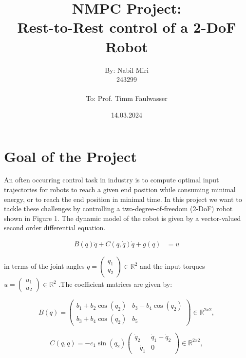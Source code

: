 \documentclass[a4paper, 12pt]{report}
\begin{document}
\title{\Large{\textbf{NMPC Project: \\Rest-to-Rest control of a 2-DoF Robot}}}
\author{By: Nabil Miri \\
243299\\
\\
To: Prof. Timm Faulwasser
}
\date{14.03.2024}
\maketitle
\let\cleardoublepage\clearpage
\newpage
\tableofcontents
\newpage
\setcounter{section}{0}
\renewcommand\thesection{\arabic{section}} %
\renewcommand\thesubsection{\alph{subsection})} %

\section{Goal of the Project}

An often occurring control task in industry is to compute optimal input trajectories for robots to reach a
given end position while consuming minimal energy, or to reach the end position in minimal time. In this
project we want to tackle these challenges by controlling a two-degree-of-freedom (2-DoF) robot shown in
Figure 1. The dynamic model of the robot is given by a vector-valued second order differential equation.

\begin{align}
B(q)\ddot{q} + C(q, \dot{q})\dot{q} + g(q) &= u
\end{align}


in terms of the joint angles $q = \begin{pmatrix} q_1 \\ q_2 \end{pmatrix} \in \mathbb{R}^2$ and the input torques $u = \begin{pmatrix} u_1 \\ u_2 \end{pmatrix}\in \mathbb{R}^2$ .The coefficient matrices are given by:

\[ B(q) = \begin{pmatrix} b_1 + b_2 \cos(q_2) & b_3 + b_4 \cos(q_2) \\ b_3 + b_4 \cos(q_2) & b_5 \end{pmatrix} \in \mathbb{R}^{2x2},\] 

$$C(q, \dot{q}) = -c_1 \sin(q_2)\begin{pmatrix} \dot{q}_2 & \dot{q}_1 + \dot{q}_2 \\-\dot{q}_1 & 0\end{pmatrix} \in \mathbb{R}^{2x2},$$
\end{document}
